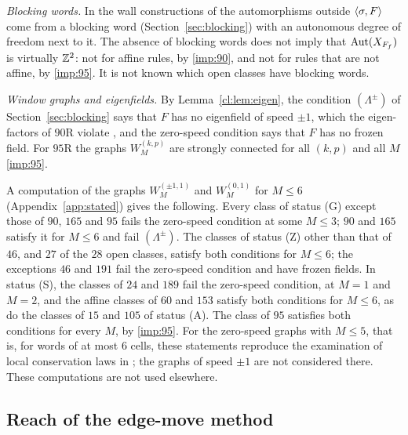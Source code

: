 \emph{Blocking words.} In the wall constructions of \cite{PaperC} the automorphisms outside $\langle\sigma,F\rangle$ come from a blocking word (Section~\ref{sec:blocking}) with an autonomous degree of freedom next to it. The absence of blocking words does not imply that $\operatorname{Aut}(X_{F_f})$ is virtually $\mathbb{Z}^2$: not for affine rules, by \eqref{imp:90}, and not for rules that are not affine, by \eqref{imp:95}. It is not known which open classes have blocking words.

\emph{Window graphs and eigenfields.} By Lemma~\ref{cl:lem:eigen}, the condition $(\Lambda^{\pm})$ of Section~\ref{sec:blocking} says that $F$ has no eigenfield of speed $\pm1$, which the eigen-factors of $90$R violate \cite{PaperC}, and the zero-speed condition says that $F$ has no frozen field. For $95$R the graphs $W^{(k,p)}_M$ are strongly connected for all $(k,p)$ and all $M$ \eqref{imp:95}.

\begin{remark}\label{cl:rem:eigen}
A computation of the graphs $W^{(\pm1,1)}_M$ and $W^{(0,1)}_M$ for $M\le6$ (Appendix~\ref{app:stated}) gives the following. Every class of status (G) except those of $90$, $165$ and $95$ fails the zero-speed condition at some $M\le3$; $90$ and $165$ satisfy it for $M\le6$ and fail $(\Lambda^{\pm})$. The classes of status (Z) other than that of $46$, and $27$ of the $28$ open classes, satisfy both conditions for $M\le6$; the exceptions $46$ and $191$ fail the zero-speed condition and have frozen fields. In status (S), the classes of $24$ and $189$ fail the zero-speed condition, at $M=1$ and $M=2$, and the affine classes of $60$ and $153$ satisfy both conditions for $M\le6$, as do the classes of $15$ and $105$ of status (A). The class of $95$ satisfies both conditions for every $M$, by \eqref{imp:95}. For the zero-speed graphs with $M\le5$, that is, for words of at most $6$ cells, these statements reproduce the examination of local conservation laws in \cite[Section~4]{Takesue1989}; the graphs of speed $\pm1$ are not considered there. These computations are not used elsewhere.
\end{remark}

\subsection{Reach of the edge-move method}\label{cl:sec:reach}

